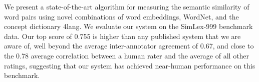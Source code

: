 We present a state-of-the-art algorithm for measuring the semantic similarity of word pairs using novel combinations of word embeddings, WordNet, and the concept dictionary 4lang. We evaluate our system on the SimLex-999 benchmark data. Our top score of 0.755 is higher than any published system that we are aware of, well beyond the average inter-annotator agreement of 0.67, and close to the 0.78 average correlation between a human rater and the average of all other ratings, suggesting that our system has achieved near-human performance on this benchmark.
